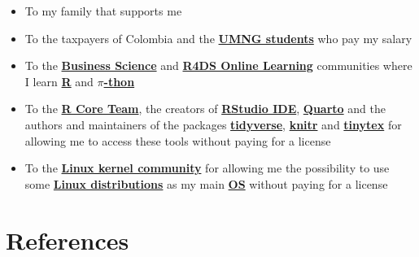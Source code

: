 \documentclass[
  ignorenonframetext,
]{beamer}
\begin{document}
\begin{frame}{}
\label{section-15}
\begin{itemize}
\item
  To my family that supports me
\item
  To the taxpayers of Colombia and the
  \href{https://www.umng.edu.co/estudiante}{\textbf{UMNG students}} who
  pay my salary
\item
  To the \href{https://www.business-science.io/}{\textbf{Business
  Science}} and \href{https://www.rfordatasci.com/}{\textbf{R4DS Online
  Learning}} communities where I learn
  \href{https://www.r-project.org/about.html}{\textbf{R}} and
  \href{https://www.python.org/about/}{\textbf{\(\pi\)-thon}}
\item
  To the \href{https://www.r-project.org/contributors.html}{\textbf{R
  Core Team}}, the creators of
  \href{https://rstudio.com/products/rstudio/}{\textbf{RStudio IDE}},
  \href{https://quarto.org/}{\textbf{Quarto}} and the authors and
  maintainers of the packages
  \href{https://CRAN.R-project.org/package=tidyverse}{\textbf{tidyverse}},
  \href{https://CRAN.R-project.org/package=knitr}{\textbf{knitr}} and
  \href{https://CRAN.R-project.org/package=tinytex}{\textbf{tinytex}}
  for allowing me to access these tools without paying for a license
\item
  To the \href{https://www.kernel.org/category/about.html}{\textbf{Linux
  kernel community}} for allowing me the possibility to use some
  \href{https://static.lwn.net/Distributions/}{\textbf{Linux
  distributions}} as my main
  \href{https://en.wikipedia.org/wiki/Operating_system}{\textbf{OS}}
  without paying for a license
\end{itemize}
\end{frame}

\section*{References}\label{references}
\end{document}
